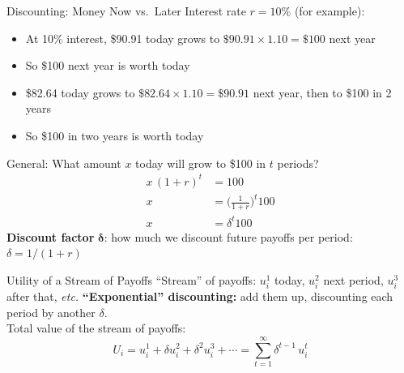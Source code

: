 \begin{frame}{Discounting: Money Now vs.\ Later}
Interest rate $r=10\%$ (for example):
\begin{itemize}
    \item At 10\% interest, \$90.91 today grows to $\$90.91\times 1.10=\$100$ next year
    \item So \$100 next year is worth \underline{\hspace{0.6in}} today
    \item \$82.64 today grows to $\$82.64\times 1.10=\$90.91$ next year, then to \$100 in 2 years
    \item So \$100 in two years is worth \underline{\hspace{0.6in}} today
\end{itemize}
\bsk
General: What amount $x$ today will grow to \$100 in $t$ periods?
\begin{align*}
    x\,(1+r)^t &= 100\\
    x &= \big(\frac{1}{1+r}\big)^t 100 \\
    x &= \delta^t 100
\end{align*}
\textbf{Discount factor} $\bm{\delta}$: how much we discount future payoffs per period: $\delta = 1/(1+r)$\\
\end{frame}

\begin{frame}{Utility of a Stream of Payoffs}
``Stream'' of payoffs: $u_i^1$ today, $u_i^2$ next period, $u_i^3$ after that, \textit{etc.}
\bsk
\textbf{``Exponential'' discounting:} add them up, discounting each period by another $\delta$.\\
Total value of the stream of payoffs:
$$U_i=u_i^1+\delta u_i^2+\delta^2 u_i^3+\cdots=\sum_{t=1}^{\infty}\delta^{t-1}\,u_i^t$$
\bsk
{}
\bsk
{}
\vspace{-0.3in}
\end{frame}


